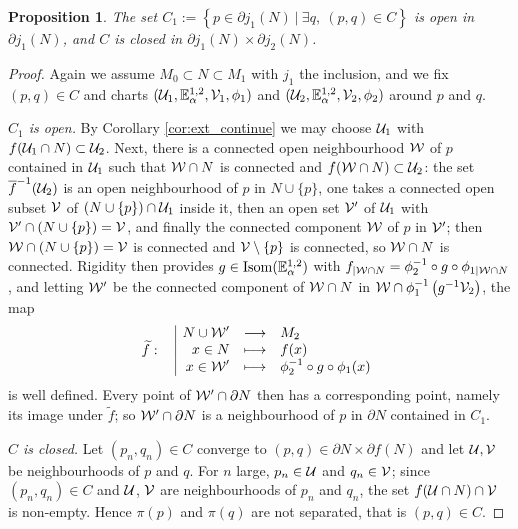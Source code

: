 \documentclass[a4paper,twoside]{article}
\newcommand{\fonctiondeux}[7]{\displaystyle#1:\begin{array}{l|rcl}
& \displaystyle #2 & \longrightarrow & \displaystyle #3 \\
    & \displaystyle #4 & \longmapsto & \displaystyle #5 \\
     & \displaystyle #6 & \longmapsto & \displaystyle #7\end{array}}
\newcommand{\mass}[1]{\mathbb{E}^{1,2}_{#1}}
\newtheorem{prop}[lem]{Proposition}
\begin{document}
\begin{prop}\label{prop:C_connexe}
The set $C_1:=\left\{p\in \partial j_1(N) ~|~ \exists q,~(p,q)\in C\right\}$ is open in $\partial
j_1(N)$, and $C$ is closed in $\partial j_1(N)\times \partial j_2(N)$.
\end{prop}
\begin{proof}
Again we assume $M_0\subset N\subset M_1$ with $j_1$ the inclusion, and we fix $(p,q)\in C$ and
charts $(\U_1,\mass{\alpha},\V_1,\phi_1)$ and $(\U_2,\mass{\alpha},\V_2,\phi_2)$ around $p$ and $q$.

\emph{$C_1$ is open.} By Corollary \ref{cor:ext_continue} we may choose $\mathcal{U}_1$ with
$f(\mathcal{U}_1\cap N)\subset \mathcal{U}_2$. Next, there is a connected open neighbourhood $\mathcal W$ of $p$ contained in
$\mathcal{U}_1$ such that $\mathcal W\cap N$ is connected and $f(\mathcal W\cap N)\subset \mathcal{U}_2$: the set $\overline
f^{-1}(\mathcal{U}_2)$ is an open neighbourhood of $p$ in $N\cup\{p\}$, one takes a connected open subset
$\mathcal V$ of $\left(N\cup\{p\}\right)\cap \mathcal{U}_1$ inside it, then an open set $\mathcal V'$ of $\mathcal{U}_1$ with
$\mathcal V'\cap\left(N\cup\{p\}\right)=\mathcal V$, and finally the connected component $\mathcal W$ of $p$ in $\mathcal V'$; then
$\mathcal W\cap\left(N\cup\{p\}\right)=\mathcal V$ is connected and $\mathcal V\setminus\{p\}$ is connected, so $\mathcal W\cap N$
is connected. Rigidity then provides $g\in \isom(\mass{\alpha})$ with $f_{|\mathcal W\cap
N}=\phi_2^{-1}\circ g\circ \phi_{1|\mathcal W\cap N}$, and letting $\mathcal W'$ be the connected component of
$\mathcal W\cap N$ in $\mathcal W\cap \phi_1^{-1}\left(g^{-1}\mathcal V_2\right)$, the map
$$\fonctiondeux{\widetilde f}{N\cup \W'}{M_2}{x \in N}{ f(x) }{x\in \W'}{\phi_2^{-1} \circ g \circ \phi_1(x)}$$
is well defined. Every point of $\mathcal W'\cap \partial N$ then has a corresponding point, namely its image
under $\widetilde f$; so $\mathcal W'\cap \partial N$ is a neighbourhood of $p$ in $\partial N$ contained in
$C_1$.

\emph{$C$ is closed.} Let $(p_n,q_n)\in C$ converge to $(p,q)\in \partial N\times \partial f(N)$ and
let $\mathcal{U},\mathcal V$ be neighbourhoods of $p$ and $q$. For $n$ large, $p_n\in \mathcal{U}$ and $q_n\in \mathcal V$; since
$(p_n,q_n)\in C$ and $\mathcal{U}$, $\mathcal V$ are neighbourhoods of $p_n$ and $q_n$, the set $f(\mathcal{U}\cap N)\cap \mathcal V$
is non-empty. Hence $\pi(p)$ and $\pi(q)$ are not separated, that is $(p,q)\in C$.
\end{proof}
\end{document}
